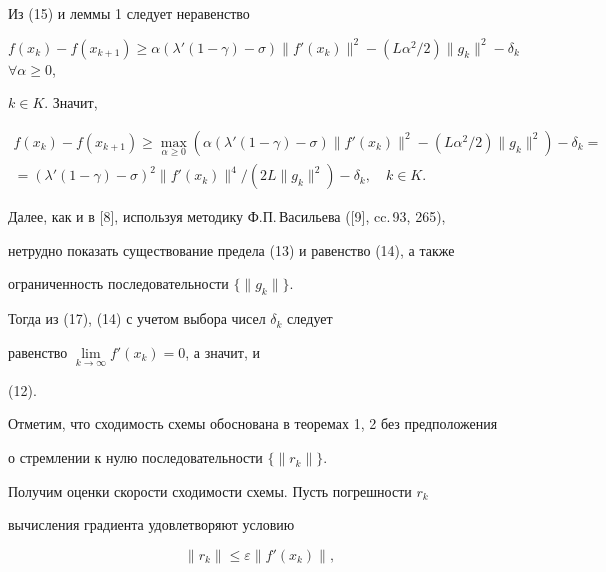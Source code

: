 \begin{pf}


Из (15) и леммы 1 следует неравенство


$f(x_k)-f(x_{k+1})\ge \alpha ({\lambda}'(1-\gamma)-\sigma)


\|{{f}'(x_k)} \|^2-


(L\alpha^2/2) \|{g_k} \|^2-\delta_k$ $\forall \alpha \ge 0$,


$k\in K$. Значит,


\begin{multline}


f(x_k)-f(x_{k+1})\ge \max_{\alpha \ge 0}(\alpha({\lambda}'(1-\gamma)-


\sigma) \|{{f}'(x_k)}


\|^2-(L\alpha^2/2) \|{g_k} \|^2)-\delta_k= \\


%


=({\lambda}'(1-\gamma)-\sigma)^2\|{{f}'(x_k)}\|^{4}/(2L\|{g_k} \|^2)-


\delta_k,\quad k\in K.


\end{multline}


Далее, как и в [8], используя методику Ф.П.\,Васильева ([9], cc.\,93, 265),


нетрудно показать существование предела (13) и равенство (14), а также


ограниченность последовательности $\{{\|{g_k} \|} \}$.


Тогда из (17), (14) с учетом выбора чисел $ \delta_k$ следует


равенство $\lim\limits_{k \to \infty} {f}'(x_k)=0$, а значит, и


(12).


\end{pf}





Отметим, что сходимость схемы обоснована в теоремах 1, 2 без предположения


о стремлении к нулю последовательности $\{{\|{r_k} \|} \}$.





Получим оценки скорости сходимости схемы. Пусть погрешности $r_k$


вычисления градиента удовлетворяют условию


\begin{equation}


\|{r_k} \|\le \varepsilon \|{{f}'(x_k)} \|,


\end{equation}


